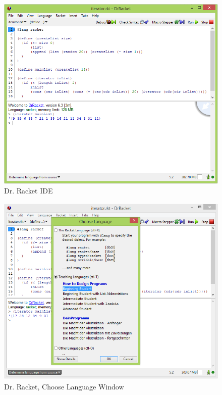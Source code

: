 \begin{figure}[H]
\begin{center}
\includegraphics[scale=0.59]{./pics/drracket.png}
\caption{Dr. Racket IDE}
\label{fig:dr_racket}
\end{center}
\end{figure}

\begin{figure}[H]
\begin{center}
\includegraphics[scale=0.59]{./pics/drracketchooselang.png}
\caption{Dr. Racket, Choose Language Window}
\label{fig:dr_racket_choose_langs}
\end{center}
\end{figure}

